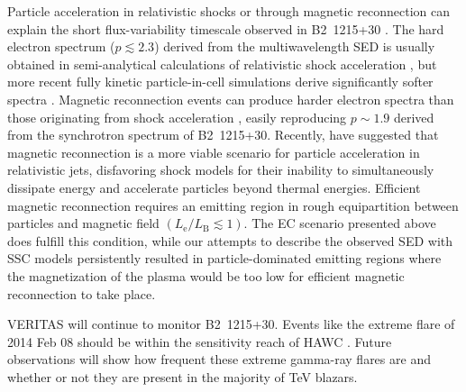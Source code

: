 \documentclass[twocolumn]{aastex6}
\def\b2{B2~1215+30}
\begin{document}
Particle acceleration in relativistic shocks or through magnetic reconnection can  explain the short flux-variability timescale observed in \b2 \citep{sironi09,2013MNRAS.431..355G}. The hard electron spectrum ($ p \lesssim 2.3$) derived from the multiwavelength SED is usually obtained in semi-analytical calculations of relativistic shock acceleration 
\citep{2001MNRAS.328..393A}, but more
recent fully kinetic particle-in-cell simulations derive significantly softer spectra \citep{sironi09}. 
Magnetic reconnection events can produce harder electron spectra than those originating from shock acceleration \citep[][]{sironi14}, easily reproducing $p\sim1.9$ derived from the synchrotron spectrum of \b2. Recently, \citet{sironi15} have suggested that magnetic reconnection is a more viable scenario for particle acceleration in relativistic jets,  disfavoring shock models for their inability to simultaneously dissipate energy and accelerate particles beyond thermal energies. Efficient magnetic reconnection requires an emitting region in rough equipartition between particles and magnetic field  $\left(L_\mathrm{e}/L_\mathrm{B} \lesssim 1 \right)$. The EC scenario presented above does fulfill this condition, while our attempts to describe the observed SED with SSC models persistently resulted in particle-dominated emitting regions where the magnetization of the plasma would be too low for efficient magnetic reconnection to take place.
 
VERITAS will continue to monitor \b2. Events like the extreme flare of 2014 Feb 08 should be within the sensitivity reach of HAWC \citep{2015arXiv150804479L}. 
Future observations will show how frequent these extreme gamma-ray flares are and whether or not they are present in the majority of TeV blazars.
\end{document}

